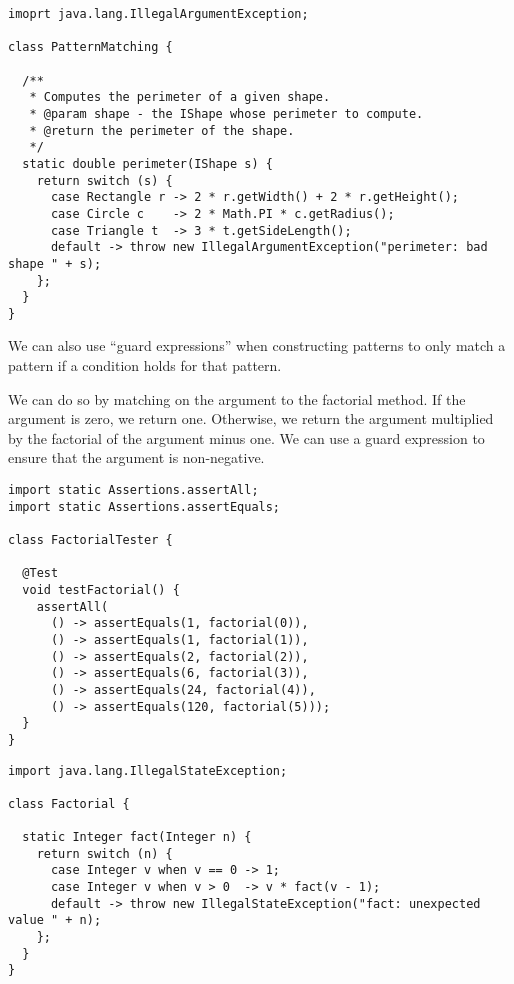 \begin{lstlisting}[language=MyJava]
imoprt java.lang.IllegalArgumentException;

class PatternMatching {

  /**
   * Computes the perimeter of a given shape.
   * @param shape - the IShape whose perimeter to compute.
   * @return the perimeter of the shape.
   */
  static double perimeter(IShape s) {
    return switch (s) {
      case Rectangle r -> 2 * r.getWidth() + 2 * r.getHeight();
      case Circle c    -> 2 * Math.PI * c.getRadius();
      case Triangle t  -> 3 * t.getSideLength();
      default -> throw new IllegalArgumentException("perimeter: bad shape " + s);
    };
  }
}
\end{lstlisting}

We can also use ``guard expressions'' when constructing patterns to only match a pattern if a condition holds for that pattern.

We can do so by matching on the argument to the factorial method. 
If the argument is zero, we return one.
Otherwise, we return the argument multiplied by the factorial of the argument minus one. 
We can use a guard expression to ensure that the argument is non-negative.

\begin{lstlisting}[language=MyJava]
import static Assertions.assertAll;
import static Assertions.assertEquals;

class FactorialTester {

  @Test
  void testFactorial() {
    assertAll(
      () -> assertEquals(1, factorial(0)),
      () -> assertEquals(1, factorial(1)),
      () -> assertEquals(2, factorial(2)),
      () -> assertEquals(6, factorial(3)),
      () -> assertEquals(24, factorial(4)),
      () -> assertEquals(120, factorial(5)));
  }
}
\end{lstlisting}

\begin{lstlisting}[language=MyJava]
import java.lang.IllegalStateException;

class Factorial {

  static Integer fact(Integer n) {
    return switch (n) {
      case Integer v when v == 0 -> 1;
      case Integer v when v > 0  -> v * fact(v - 1);
      default -> throw new IllegalStateException("fact: unexpected value " + n);
    };
  }
}
\end{lstlisting}

